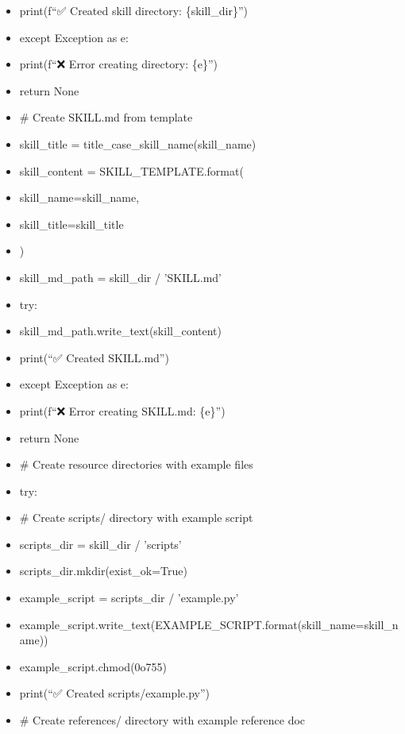 \documentclass[11pt]{article}
\begin{document}
\begin{itemize}[leftmargin=*,itemsep=2pt,topsep=2pt]
\item {} print(f``✅ Created skill directory: \{skill\_\allowbreak{}dir\}'')
\item {} except Exception as e:
\item {} print(f``❌ Error creating directory: \{e\}'')
\item {} return None
\item {} \# Create SKILL.md from template
\item {} skill\_\allowbreak{}title = title\_\allowbreak{}case\_\allowbreak{}skill\_\allowbreak{}name(skill\_\allowbreak{}name)
\item {} skill\_\allowbreak{}content = SKILL\_\allowbreak{}TEMPLATE.format(
\item {} skill\_\allowbreak{}name=skill\_\allowbreak{}name,
\item {} skill\_\allowbreak{}title=skill\_\allowbreak{}title
\item {} )
\item {} skill\_\allowbreak{}md\_\allowbreak{}path = skill\_\allowbreak{}dir / 'SKILL.md'
\item {} try:
\item {} skill\_\allowbreak{}md\_\allowbreak{}path.write\_\allowbreak{}text(skill\_\allowbreak{}content)
\item {} print(``✅ Created SKILL.md'')
\item {} except Exception as e:
\item {} print(f``❌ Error creating SKILL.md: \{e\}'')
\item {} return None
\item {} \# Create resource directories with example files
\item {} try:
\item {} \# Create scripts/ directory with example script
\item {} scripts\_\allowbreak{}dir = skill\_\allowbreak{}dir / 'scripts'
\item {} scripts\_\allowbreak{}dir.mkdir(exist\_\allowbreak{}ok=True)
\item {} example\_\allowbreak{}script = scripts\_\allowbreak{}dir / 'example.py'
\item {} example\_\allowbreak{}script.write\_\allowbreak{}text(EXAMPLE\_\allowbreak{}SCRIPT.format(skill\_\allowbreak{}name=skill\_\allowbreak{}name))
\item {} example\_\allowbreak{}script.chmod(0o755)
\item {} print(``✅ Created scripts/example.py'')
\item {} \# Create references/ directory with example reference doc

\end{itemize}
\end{document}
